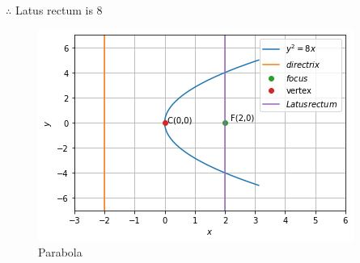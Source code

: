 \documentclass[journal,12pt,twocolumn]{IEEEtran}
\begin{document}
$\therefore$ Latus rectum is 8
\begin{figure}[ht]
    \centering
    \includegraphics[width=\columnwidth]{parabola.png}
    \caption{Parabola}
    \label{Graphical solution}
\end{figure}
\end{document}
